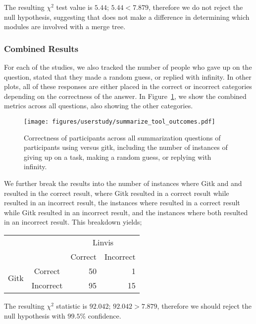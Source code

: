 The resulting $\chi^2$ test value is $5.44$; $5.44 < 7.879$, therefore
we do not reject the null hypothesis, suggesting that \tool does not
make a difference in determining which modules are involved with a merge
tree.


\subsubsection{Combined Results}
\label{ssub:combined_results}

For each of the studies, we also tracked the number of people who gave
up on the question, stated that they made a random guess, or replied
with infinity. In other plots, all of these responses are either placed
in the correct or incorrect categories depending on the correctness of
the answer. In Figure~\ref{fig:summarization_correctness}, we show the
combined metrics across all questions, also showing the other
categories.

\begin{figure}[htpb]
  \centering
  \texttt{[image: figures/userstudy/summarize\_tool\_outcomes.pdf]}
  \caption{Correctness of participants across all summarization
    questions of participants using \tool versus gitk, including the
    number of instances of giving up on a task, making a random guess,
    or replying with infinity.}
  \label{fig:summarization_correctness}
\end{figure}


We further break the results into the number of instances where Gitk and
and \tool resulted in the correct result, where Gitk resulted in a
correct result while \tool resulted in an incorrect result, the
instances where \tool resulted in a correct result while Gitk resulted
in an incorrect result, and the instances where both resulted in an
incorrect result. This breakdown yields;

\begin{center}
  \begin{tabular}{cc|rr}
                          &           & \multicolumn{2}{c}{Linvis}\\
                          &           & Correct                      & Incorrect\\\hline
    \multirow{2}{*}{Gitk} & Correct   & 50                           & 1\\
                          & Incorrect & 95                           & 15\\
  \end{tabular}
\end{center}

The resulting $\chi^2$ statistic is $92.042$; $92.042 > 7.879$,
therefore we should reject the null hypothesis with $99.5\%$ confidence.
